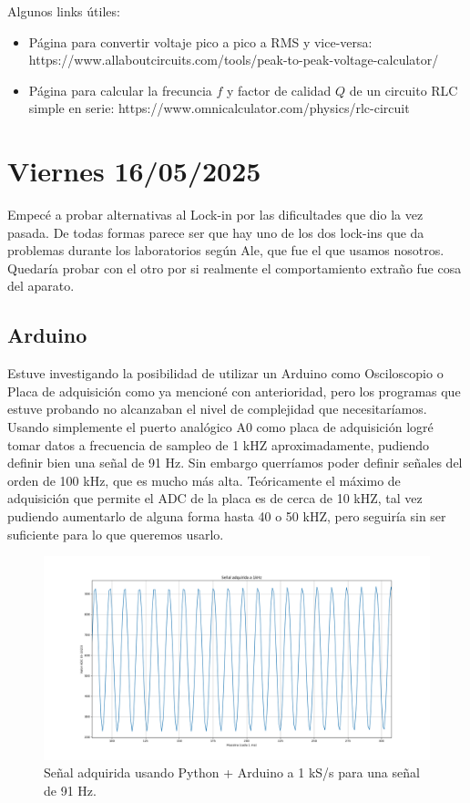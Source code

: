 Algunos links útiles: %
\begin{itemize}
	\item Página para convertir voltaje pico a pico a RMS y vice-versa: https://www.allaboutcircuits.com/tools/peak-to-peak-voltage-calculator/
	\item Página para calcular la frecuncia $f$ y factor de calidad $Q$ de un circuito RLC simple en serie: https://www.omnicalculator.com/physics/rlc-circuit %
\end{itemize}


\section{Viernes 16/05/2025}
Empecé a probar alternativas al Lock-in por las dificultades que dio la vez pasada. De todas formas parece ser que hay uno de los dos lock-ins que da problemas durante los laboratorios según Ale, que fue el que usamos nosotros. Quedaría probar con el otro por si realmente el comportamiento extraño fue cosa del aparato.

\subsection*{Arduino}
Estuve investigando la posibilidad de utilizar un Arduino como Osciloscopio o Placa de adquisición como ya mencioné con anterioridad, pero los programas que estuve probando no alcanzaban el nivel de complejidad que necesitaríamos. Usando simplemente el puerto analógico A0 como placa de adquisición logré tomar datos a frecuencia de sampleo de 1 kHZ aproximadamente, pudiendo definir bien una señal de 91 Hz. Sin embargo querríamos poder definir señales del orden de 100 kHz, que es mucho más alta. Teóricamente el máximo de adquisición que permite el ADC de la placa es de cerca de 10 kHZ, tal vez pudiendo aumentarlo de alguna forma hasta 40 o 50 kHZ, pero seguiría sin ser suficiente para lo que queremos usarlo. %

\begin{figure}[!ht]
	\centering
	\includegraphics[width=0.97\linewidth]{Figures/12_05_2025/Placa_1kHz_MEDIR91_HZ_Zoom.png}
	\caption{Señal adquirida usando Python + Arduino a 1 kS/s para una señal de 91 Hz.}
	\label{fig:placa1khzmedir91hzzoom}
\end{figure}
